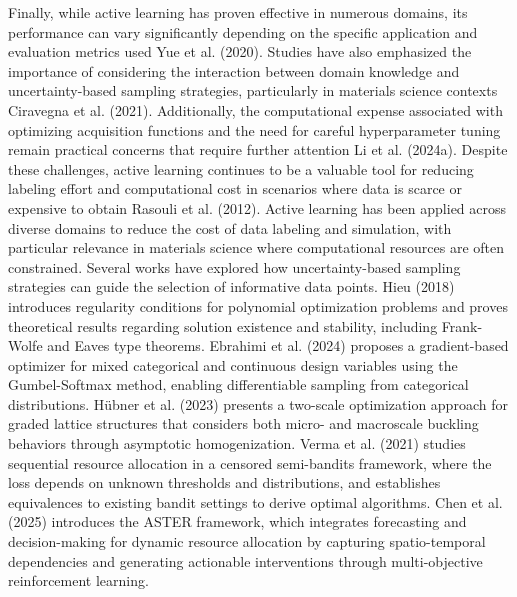 Finally, while active learning has proven effective in numerous domains, its performance can vary significantly depending on the specific application and evaluation metrics used Yue et al. (2020). Studies have also emphasized the importance of considering the interaction between domain knowledge and uncertainty-based sampling strategies, particularly in materials science contexts Ciravegna et al. (2021). Additionally, the computational expense associated with optimizing acquisition functions and the need for careful hyperparameter tuning remain practical concerns that require further attention Li et al. (2024a). Despite these challenges, active learning continues to be a valuable tool for reducing labeling effort and computational cost in scenarios where data is scarce or expensive to obtain Rasouli et al. (2012). Active learning has been applied across diverse domains to reduce the cost of data labeling and simulation, with particular relevance in materials science where computational resources are often constrained. Several works have explored how uncertainty-based sampling strategies can guide the selection of informative data points. Hieu (2018) introduces regularity conditions for polynomial optimization problems and proves theoretical results regarding solution existence and stability, including Frank-Wolfe and Eaves type theorems. Ebrahimi et al. (2024) proposes a gradient-based optimizer for mixed categorical and continuous design variables using the Gumbel-Softmax method, enabling differentiable sampling from categorical distributions. Hübner et al. (2023) presents a two-scale optimization approach for graded lattice structures that considers both micro- and macroscale buckling behaviors through asymptotic homogenization. Verma et al. (2021) studies sequential resource allocation in a censored semi-bandits framework, where the loss depends on unknown thresholds and distributions, and establishes equivalences to existing bandit settings to derive optimal algorithms. Chen et al. (2025) introduces the ASTER framework, which integrates forecasting and decision-making for dynamic resource allocation by capturing spatio-temporal dependencies and generating actionable interventions through multi-objective reinforcement learning.

